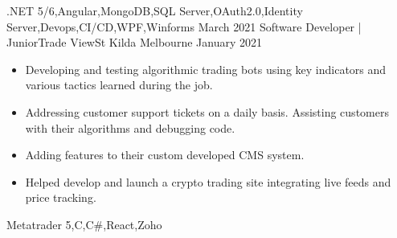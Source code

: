 \begin{experiences}
{\begin{itemize}
                      \end{itemize}
                    }
                    {.NET 5/6,Angular,MongoDB,SQL Server,OAuth2.0,Identity Server,Devops,CI/CD,WPF,Winforms}
  \emptySeparator
  \experience
    {March 2021}     {Software Developer | Junior}{Trade View}{St Kilda Melbourne}
    {January 2021}    {
                      \begin{itemize}
                        \item Developing and testing algorithmic trading bots using key indicators and various tactics learned during the job.
                        \item Addressing customer support tickets on a daily basis. Assisting customers with their algorithms and debugging code.
                        \item Adding features to their custom developed CMS system.
                        \item Helped develop and launch a crypto trading site integrating live feeds and price tracking. 
                      \end{itemize}
                    }
                    {Metatrader 5,C,C\#,React,Zoho}
  \emptySeparator
\end{experiences}

